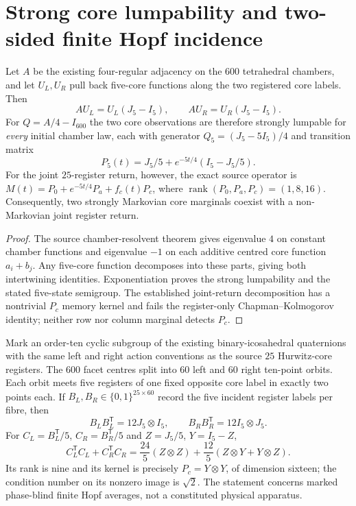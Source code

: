 \documentclass[11pt]{article}
\begin{document}
\section{Strong core lumpability and two-sided finite Hopf incidence}
\label{p1b:sec:cc20-core-lumping-hopf}
\begin{theorem}
\label{p1b:thm:cc20-two-core-lumping}
Let $A$ be the existing four-regular adjacency on the $600$ tetrahedral
chambers, and let $U_L,U_R$ pull back five-core functions along the two
registered core labels.  Then
\[
 AU_L=U_L(J_5-I_5),\qquad AU_R=U_R(J_5-I_5).
\]
For $Q=A/4-I_{600}$ the two core observations are therefore strongly
lumpable for \emph{every} initial chamber law, each with generator
$Q_5=(J_5-5I_5)/4$ and transition matrix
\[
 P_5(t)=J_5/5+e^{-5t/4}(I_5-J_5/5).
\]
For the joint $25$-register return, however, the exact source operator is
$M(t)=P_0+e^{-5t/4}P_a+f_c(t)P_c$, where
$\operatorname{rank}(P_0,P_a,P_c)=(1,8,16)$.  Consequently, two strongly
Markovian core marginals coexist with a non-Markovian joint register return.
\end{theorem}
\begin{proof}
The source chamber-resolvent theorem gives eigenvalue $4$ on constant
chamber functions and eigenvalue $-1$ on each additive centred core
function $a_i+b_j$.  Any five-core function decomposes into these
parts, giving both intertwining identities.  Exponentiation proves the
strong lumpability and the stated five-state semigroup.  The established
joint-return decomposition has a nontrivial $P_c$ memory kernel and
fails the register-only Chapman--Kolmogorov identity; neither row nor
column marginal detects $P_c$.
\end{proof}
\begin{theorem}
\label{p1b:thm:cc20-dual-hopf-incidence}
Mark an order-ten cyclic subgroup of the existing binary-icosahedral
quaternions with the same left and right action conventions as the
source $25$ Hurwitz-core registers.  The $600$ facet centres split into
$60$ left and $60$ right ten-point orbits.  Each orbit meets five
registers of one fixed opposite core label in exactly two points each.
If $B_L,B_R\in\{0,1\}^{25\times60}$ record the five incident register
labels per fibre, then
\[
 B_LB_L^{\mathsf T}=12J_5\otimes I_5,\qquad
 B_RB_R^{\mathsf T}=12I_5\otimes J_5.
\]
For $C_L=B_L^{\mathsf T}/5$, $C_R=B_R^{\mathsf T}/5$ and
$Z=J_5/5$, $Y=I_5-Z$,
\[
 C_L^{\mathsf T}C_L+C_R^{\mathsf T}C_R
 =\frac{24}{5}(Z\otimes Z)
 +\frac{12}{5}(Z\otimes Y+Y\otimes Z).
\]
Its rank is nine and its kernel is precisely
$P_c=Y\otimes Y$, of dimension sixteen; the condition number on its
nonzero image is $\sqrt2$.  The statement concerns marked
phase-blind finite Hopf averages, not a constituted physical apparatus.
\end{theorem}
\end{document}
